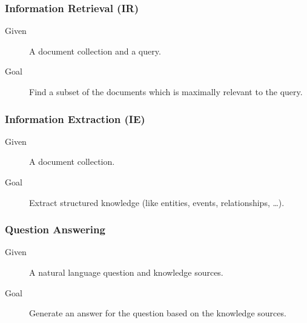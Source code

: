 \documentclass[a4paper, 11pt, accentcolor = tud3b]{tudreport}
\begin{document}
	            \subsubsection{Information Retrieval (IR)} %
	            	\begin{description}
	            		\item[Given] A document collection and a query.
	            		\item[Goal] Find a subset of the documents which is maximally relevant to the query.
	            	\end{description}
	            
	            \subsubsection{Information Extraction (IE)} %
		            \begin{description}
		            	\item[Given] A document collection.
		            	\item[Goal] Extract structured knowledge (like entities, events, relationships, \dots).
		            \end{description}
	            
	            \subsubsection{Question Answering} %
		            \begin{description}
		            	\item[Given] A natural language question and knowledge sources.
		            	\item[Goal] Generate an answer for the question based on the knowledge sources.
		            \end{description}
	            
\end{document}
